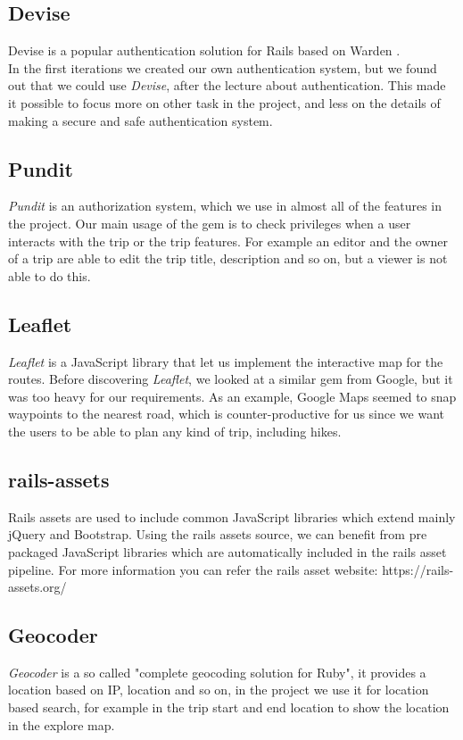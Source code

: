 \documentclass[a4paper]{article}
\begin{document}
\subsection{Devise}
Devise is a popular authentication solution for Rails based on Warden \cite{devise}. \\
In the first iterations we created our own authentication system, but we found out that we could use \textit{Devise}, after the lecture about authentication. This made it possible to focus more on other task in the project, and less on the details of making a secure and safe authentication system. 

\subsection{Pundit}
\textit{Pundit} is an authorization system\cite{pundit}, which we use in almost all of the features in the project. Our main usage of the gem is to check privileges when a user interacts with the trip or the trip features. For example an editor and the owner of a trip are able to edit the trip title, description and so on, but a viewer is not able to do this. 

\subsection{Leaflet}
\textit{Leaflet}\cite{leaflet} is a JavaScript library that let us implement the interactive map for the routes. Before discovering \textit{Leaflet}, we looked at a similar gem from Google, but it was too heavy for our requirements. As an example, Google Maps seemed to snap waypoints to the nearest road, which is counter-productive for us since we want the users to be able to plan any kind of trip, including hikes.

\subsection{rails-assets}
Rails assets are used to include common JavaScript libraries which extend mainly jQuery and Bootstrap. Using the rails assets source, we can benefit from pre packaged JavaScript libraries which are automatically included in the rails asset pipeline. For more information you can refer the rails asset website: https://rails-assets.org/

\subsection{Geocoder}
\textit{Geocoder} is a so called "complete geocoding solution for Ruby"\cite{geocoder}, it provides a location based on IP, location and so on, in the project we use it for location based search, for example in the trip start and end location to show the location in the explore map. 
\end{document}
